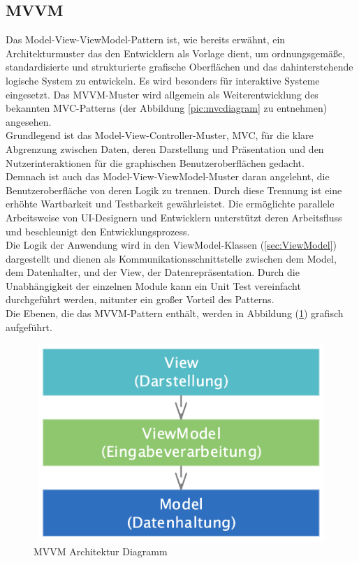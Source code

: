 \subsection{MVVM}
\label{chap:MVVM}
Das Model-View-ViewModel-Pattern ist, wie bereits erwähnt, ein Architekturmuster das den Entwicklern als Vorlage dient, um ordnungsgemäße, 
standardisierte und strukturierte grafische Oberflächen und das dahinterstehende logische System zu entwickeln. Es wird besonders für 
interaktive Systeme eingesetzt. Das MVVM-Muster wird allgemein als Weiterentwicklung des bekannten MVC-Patterns (der Abbildung \ref{pic:mvcdiagram} zu entnehmen) angesehen. 
\\
Grundlegend ist das Model-View-Controller-Muster, MVC, für die klare Abgrenzung zwischen Daten, deren Darstellung und Präsentation und den 
Nutzerinteraktionen für die graphischen Benutzeroberflächen gedacht. 
\\ 
\linebreak
Demnach ist auch das Model-View-ViewModel-Muster daran angelehnt, die Benutzeroberfläche von deren Logik zu trennen. Durch diese Trennung 
ist eine erhöhte Wartbarkeit und Testbarkeit gewährleistet. Die ermöglichte parallele Arbeitsweise von UI-Designern und Entwicklern 
unterstützt deren Arbeitsfluss und beschleunigt den Entwicklungsprozess. \cite{mvvmentwickler.2010s} 
\\ 
\linebreak
Die Logik der Anwendung wird in den ViewModel-Klassen (\ref{sec:ViewModel}) dargestellt und dienen als Kommunikationsschnittstelle zwischen 
dem Model, dem Datenhalter, und der View, der Datenrepräsentation. Durch die Unabhängigkeit der einzelnen Module kann ein Unit Test vereinfacht 
durchgeführt werden, mitunter ein großer Vorteil des Patterns. 
\\ 
Die Ebenen, die das MVVM-Pattern enthält, werden in Abbildung (\ref{pic:mvvmdiagram}) grafisch aufgeführt.
\begin{figure}[hbt!]
    \centering
    \includegraphics[width=15cm,height=7.5cm,keepaspectratio]{2GrundlagenX/Bilder/mvvmDiagramm.png}
    \caption{MVVM Architektur Diagramm \cite{mvvmDiagramm.2015n}}
    \label{pic:mvvmdiagram}
\end{figure} 
